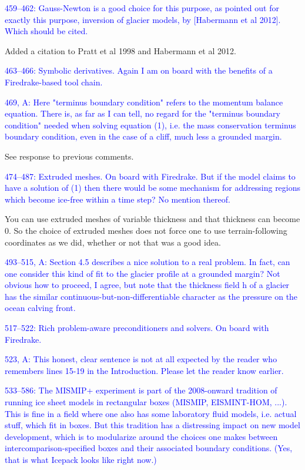 \documentclass{article}
\theoremstyle{definition}
\theoremstyle{plain}
\begin{document}
\textcolor{blue}{459--462:  Gauss-Newton is a good choice for this purpose, as pointed out for exactly this purpose, inversion of glacier models, by [Habermann et al 2012].  Which should be cited.}

Added a citation to Pratt et al 1998 and Habermann et al 2012.

\textcolor{blue}{463--466:  Symbolic derivatives.  Again I am on board with the benefits of a Firedrake-based tool chain.}

\textcolor{blue}{469, A:  Here "terminus boundary condition" refers to the momentum balance equation.  There is, as far as I can tell, no regard for the "terminus boundary condition" needed when solving equation (1), i.e. the mass conservation terminus boundary condition, even in the case of a cliff, much less a grounded margin.}

See response to previous comments.

\textcolor{blue}{474--487:  Extruded meshes.  On board with Firedrake.  But if the model claims to have a solution of (1) then there would be some mechanism for addressing regions which become ice-free within a time step?  No mention thereof.}

You can use extruded meshes of variable thickness and that thickness can become 0.
So the choice of extruded meshes does not force one to use terrain-following coordinates as we did, whether or not that was a good idea.

\textcolor{blue}{493--515, A:  Section 4.5 describes a nice solution to a real problem.  In fact, can one consider this kind of fit to the glacier profile at a grounded margin?  Not obvious how to proceed, I agree, but note that the thickness field h of a glacier has the similar continuous-but-non-differentiable character as the pressure on the ocean calving front.}

\textcolor{blue}{517--522:  Rich problem-aware preconditioners and solvers.  On board with Firedrake.}

\textcolor{blue}{523, A:  This honest, clear sentence is not at all expected by the reader who remembers lines 15-19 in the Introduction.  Please let the reader know earlier.}

\textcolor{blue}{533--586:  The MISMIP+ experiment is part of the 2008-onward tradition of running ice sheet models in rectangular boxes (MISMIP, EISMINT-HOM, ...).  This is fine in a field where one also has some laboratory fluid models, i.e. actual stuff, which fit in boxes.  But this tradition has a distressing impact on new model development, which is to modularize around the choices one makes between intercomparison-specified boxes and their associated boundary conditions.  (Yes, that is what Icepack looks like right now.)}
\end{document}
